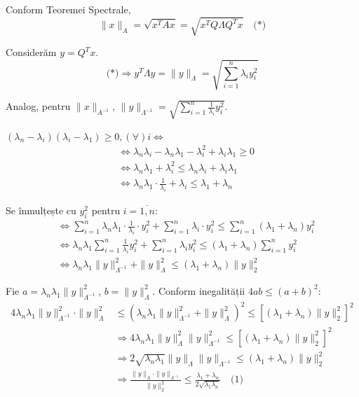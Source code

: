 \begin{demonstratie}

    Conform Teoremei Spectrale,
    $$ 
    \|x\|_A = \sqrt{x^T A x} = \sqrt{x^T Q \Lambda Q^T x} \quad \text{(*)}
    $$ 

    Considerăm $y = Q^T x$.
    $$ 
    \text{(*)} \Rightarrow y^T \Lambda y = \|y\|_\Lambda = \sqrt{\sum_{i=1}^n \lambda_i y_i^2}
    $$

    Analog, pentru $\|x\|_{A^{-1}} \text{, }  \|y\|_{\Lambda^{-1}} = \sqrt{\sum_{i=1}^n \frac{1}{\lambda_i} y_i^2}$.

    \bigskip

    \begin{observatie}
        $(\lambda_n - \lambda_i)(\lambda_i - \lambda_1) \ge 0, (\forall) i \iff $
        \begin{align*}
            &\iff \lambda_n \lambda_i - \lambda_n \lambda_1 - \lambda_i^2 + \lambda_i \lambda_1 \ge 0 \\
            &\iff \lambda_n \lambda_1 + \lambda_i^2 \le \lambda_n \lambda_i + \lambda_i \lambda_1 \\
            &\iff \lambda_n \lambda_1 \cdot \frac{1}{\lambda_i} + \lambda_i \le \lambda_1 + \lambda_n
        \end{align*}
    \end{observatie}

    Se înmulțește cu $y_i^2$ pentru $i = \overline{1, n}$:
    \begin{align*}
        &\iff \sum_{i=1}^n \lambda_n \lambda_1 \cdot \frac{1}{\lambda_i} \cdot y_i^2 + \sum_{i=1}^n \lambda_i \cdot y_i^2 \le \sum_{i=1}^n (\lambda_1 + \lambda_n) y_i^2 \\
        &\iff \lambda_n \lambda_1 \sum_{i=1}^n \frac{1}{\lambda_i} y_i^2 + \sum_{i=1}^n \lambda_i y_i^2 \le (\lambda_1 + \lambda_n) \sum_{i=1}^n y_i^2 \\
        &\iff \lambda_n \lambda_1 \|y\|^2_{\Lambda^{-1}} + \|y\|^2_\Lambda \le (\lambda_1 + \lambda_n) \|y\|^2_2
    \end{align*}

    \bigskip

    Fie $a = \lambda_n \lambda_1 \|y\|^2_{\Lambda^{-1}}$, $b = \|y\|^2_\Lambda$. Conform inegalității $4 a b \le (a + b)^2$:
    \begin{align*}
        4 \lambda_n \lambda_1 \|y\|^2_{\Lambda^{-1}} \cdot \|y\|^2_\Lambda &\le \left( \lambda_n \lambda_1 \|y\|^2_{\Lambda^{-1}} + \|y\|^2_\Lambda \right)^2 \le \left[ (\lambda_1 + \lambda_n) \|y\|_2^2 \right]^2 \\
        &\Rightarrow 4 \lambda_n \lambda_1 \|y\|^2_\Lambda \|y\|^2_{\Lambda^{-1}} \le \left[ (\lambda_1 + \lambda_n) \|y\|_2^2 \right]^2 \\
        &\Rightarrow 2 \sqrt{\lambda_n \lambda_1} \|y\|_\Lambda \|y\|_{\Lambda^{-1}} \le (\lambda_1 + \lambda_n) \|y\|_2^2 \\
        &\Rightarrow \frac{\|y\|_\Lambda \cdot \|y\|_{\Lambda^{-1}}}{\|y\|_2^2} \le \frac{\lambda_1 + \lambda_n}{2 \sqrt{\lambda_1 \lambda_n}} \quad \text{(1)}
    \end{align*}


\end{demonstratie}
